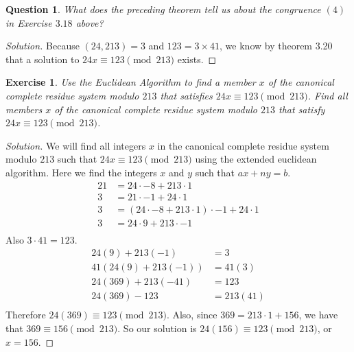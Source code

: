 \documentclass[12pt,leqno]{article}
\numberwithin{equation}{section}
\newtheorem{exer}[thm]{Exercise}
\newtheorem{ques}[thm]{Question}
\theoremstyle{definition}
\begin{document}
\begin{ques}
What does the preceding theorem tell us about the congruence $(4)$
in Exercise $3.18$ above?
\end{ques}

\begin{proof}[Solution]
Because $(24, 213) = 3$ and $123 = 3 \times 41$, we know by theorem 3.20 that a solution to $24x \equiv 123 \pmod{213}$ exists.
\end{proof}

\pagebreak
\begin{exer}
Use the Euclidean Algorithm to find a
member $x$ of the canonical complete residue system modulo $213$
that satisfies $24x \equiv 123 \pmod{213}$. Find all members $x$ of
the canonical complete residue system modulo $213$ that satisfy $24x
\equiv 123 \pmod{213}$.
\end{exer}

\begin{proof}[Solution]
We will find all integers $x$ in the canonical complete residue system modulo $213$ such that $24x \equiv 123 \pmod{213}$ using the extended euclidean algorithm.  Here we find the integers $x$ and $y$ such that $ax + ny = b$.
\begin{align*}
21 &= 24 \cdot -8 + 213 \cdot 1\\
3 &= 21 \cdot -1 + 24 \cdot 1\\
3 &= (24 \cdot -8 + 213 \cdot 1) \cdot -1 + 24 \cdot 1\\
3 &= 24 \cdot 9 + 213 \cdot -1\\
\end{align*}
Also $3\cdot 41 = 123$.
\begin{align*}
24(9) + 213(-1) &= 3\\
41(24(9) + 213(-1)) &= 41(3)\\
24(369) + 213(-41) &= 123\\
24(369) - 123 &= 213(41)\\
\end{align*}
Therefore $24(369) \equiv 123 \pmod{213}$.  Also, since $369 = 213 \cdot 1 + 156$, we have that $369 \equiv 156 \pmod{213}$.  So our solution is $24(156) \equiv 123 \pmod{213}$, or $x = 156$.
\end{proof}
\end{document}
